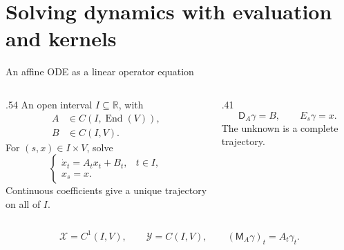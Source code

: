 \section[Algebraic solution]{Solving dynamics with evaluation and kernels}

\begin{frame}[t]{An affine ODE as a linear operator equation}
\hypertarget{main:ivp}{}
\begin{columns}[T,onlytextwidth]
  \begin{column}{.54\textwidth}
    An open interval $I\subseteq\mathbb R$, with
    \begin{equation*}
      \begin{aligned}
        A&\in C(I,\operatorname{End}(V)),\\
        B&\in C(I,V).
      \end{aligned}
    \end{equation*}
    For $(s,x)\in I\times V$, solve
    \begin{equation*}
      \begin{cases}
        \dot x_t=A_tx_t+B_t,&t\in I,\\
        x_s=x.
      \end{cases}
    \end{equation*}
    Continuous coefficients give a unique trajectory on all of $I$.
  \end{column}
  \begin{column}{.41\textwidth}
    \begin{equation*}
      \mathsf D_A\gamma=B,\qquad E_s\gamma=x.
    \end{equation*}
    The unknown is a complete trajectory.
  \end{column}
\end{columns}
\begin{equation*}
  \mathcal X=C^1(I,V),\qquad \mathcal Y=C(I,V),\qquad
  (\mathsf M_A\gamma)_t=A_t\gamma_t.
\end{equation*}
\end{frame}

